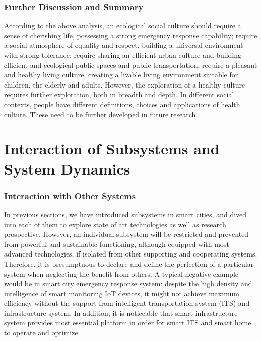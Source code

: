 \documentclass[letterpaper, twocolumn, 10pt, conference]{IEEEtran}
\begin{document}
\subsubsection{Further Discussion and Summary}
\label{sssec:css:smart_humanity:discussion}

According to the above analysis, an ecological social culture should require a sense of cherishing life, possessing a strong emergency response capability; require a social atmosphere of equality and respect, building a universal environment with strong tolerance; require sharing an efficient urban culture and building efficient and ecological public spaces and public transportation; require a pleasant and healthy living culture, creating a livable living environment suitable for children, the elderly and adults. However, the exploration of a healthy culture requires further exploration, both in breadth and depth. In different social contexts, people have different definitions, choices and applications of health culture. These need to be further developed in future research.



\section{Interaction of Subsystems and System Dynamics} \label{sec:InteractionSubsystems}

\subsubsection{Interaction with Other Systems}
\label{sssec:css:smart_humanity:interaction}



In previous sections, we have introduced subsystems in smart cities, and dived into each of them to explore state of art technologies as well as research prospective. However, an individual subsystem will be restricted and prevented from powerful and sustainable functioning, although equipped with most advanced technologies, if isolated from other supporting and cooperating systems. Therefore, it is presumptuous to declare and define the perfection of a particular system when neglecting the benefit from others. A typical negative example would be in smart city emergency response system: despite the high density and intelligence of smart monitoring IoT devices, it might not achieve maximum efficiency without the support from intelligent transportation system (ITS) and infrastructure system. In addition, it is noticeable that smart infrastructure system provides most essential platform in order for smart ITS and smart home to operate and optimize.
\end{document}
